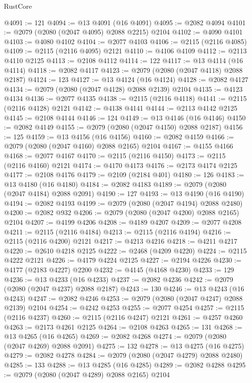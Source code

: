 \begin{lexlean}{RustCore}
\begin{coremodule}
@4091 := 121
@4094 := @13 @4091 (@16 @4091)
@4095 := @2082 @4094
@4101 := @2079 (@2080 (@2047 @4095) @2088 @2215) @2104
@4102 := @4090 @4101
@4103 := @4080 @4102
@4104 := @2077 @4103
@4106 := @2115 (@2116 @4085)
@4109 := @2115 (@2116 @4095) @2121
@4110 := @4106 @4109
@4112 := @2113 @4110 @2125
@4113 := @2108 @4112
@4114 := 122
@4117 := @13 @4114 (@16 @4114)
@4118 := @2082 @4117
@4123 := @2079 (@2080 (@2047 @4118) @2088 @2187)
@4124 := 123
@4127 := @13 @4124 (@16 @4124)
@4128 := @2082 @4127
@4134 := @2079 (@2080 (@2047 @4128) @2088 @2139) @2104
@4135 := @4123 @4134
@4136 := @2077 @4135
@4138 := @2115 (@2116 @4118)
@4141 := @2115 (@2116 @4128) @2121
@4142 := @4138 @4141
@4144 := @2113 @4142 @2125
@4145 := @2108 @4144
@4146 := 124
@4149 := @13 @4146 (@16 @4146)
@4150 := @2082 @4149
@4155 := @2079 (@2080 (@2047 @4150) @2088 @2187)
@4156 := 125
@4159 := @13 @4156 (@16 @4156)
@4160 := @2082 @4159
@4166 := @2079 (@2080 (@2047 @4160) @2088 @2165) @2104
@4167 := @4155 @4166
@4168 := @2077 @4167
@4170 := @2115 (@2116 @4150)
@4173 := @2115 (@2116 @4160) @2121
@4174 := @4170 @4173
@4176 := @2173 @4174 @2125
@4177 := @2108 @4176
@4179 := @2109 (@2184 @401)
@4180 := 126
@4183 := @13 @4180 (@16 @4180)
@4184 := @2082 @4183
@4189 := @2079 (@2080 (@2047 @4184) @2088 @2091)
@4190 := 127
@4193 := @13 @4190 (@16 @4190)
@4194 := @2082 @4193
@4199 := @2079 (@2080 (@2047 @4194) @2088 @2480)
@4200 := @2082 @932
@4206 := @2079 (@2080 (@2047 @4200) @2088 @2165) @2104
@4207 := @4199 @4206
@4208 := @4189 @4207
@4209 := @2077 @4208
@4211 := @2115 (@2116 @4184)
@4213 := @2115 (@2116 @4194)
@4216 := @2115 (@2116 @4200) @2121
@4217 := @4213 @4216
@4218 := @4211 @4217
@4220 := @2610 @4218 @2125
@4222 := @2468 (@4209 @4220)
@4224 := @2115 @4222 @2121
@4226 := @4179 @4224 @2125
@4227 := @2194 @4226
@4230 := @4177 (@2183 @4227) @2200
@4232 := @4145 (@4168 @4230)
@4233 := 129
@4236 := @13 @4233 (@16 @4233)
@4237 := @2082 @4236
@4242 := @2079 (@2080 (@2047 @4237) @2088 @2187)
@4243 := 130
@4246 := @13 @4243 (@16 @4243)
@4247 := @2082 @4246
@4253 := @2079 (@2080 (@2047 @4247) @2088 @2139) @2104
@4254 := @4242 @4253
@4255 := @2077 @4254
@4257 := @2115 (@2116 @4237)
@4260 := @2115 (@2116 @4247) @2121
@4261 := @4257 @4260
@4263 := @2173 @4261 @2125
@4264 := @2108 @4263
@4265 := 131
@4268 := @13 @4265 (@16 @4265)
@4269 := @2082 @4268
@4274 := @2079 (@2080 (@2047 @4269) @2088 @2091)
@4275 := 132
@4278 := @13 @4275 (@16 @4275)
@4279 := @2082 @4278
@4284 := @2079 (@2080 (@2047 @4279) @2088 @2480)
@4285 := 133
@4288 := @13 @4285 (@16 @4285)
@4289 := @2082 @4288
@4295 := @2079 (@2080 (@2047 @4289) @2088 @2165) @2104

\end{coremodule}
\end{lexlean}
